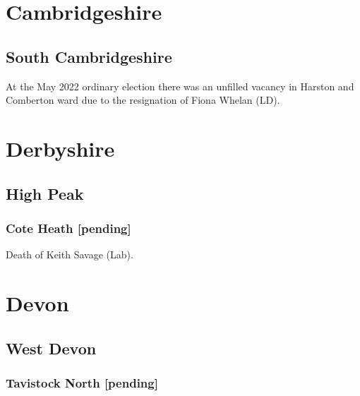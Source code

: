 \documentclass[a4paper,openany]{book}
\begin{document}
\begin{resultsiii}
\section{Cambridgeshire}

\subsection*{South Cambridgeshire}

At the May 2022 ordinary election there was an unfilled vacancy in Harston and Comberton ward due to the resignation of Fiona Whelan (LD).%

\section{Derbyshire}

\subsection*{High Peak}

\subsubsection*{Cote Heath \hspace*{\fill}\nolinebreak[1]%
	\enspace\hspace*{\fill}
	[pending]}


Death of Keith Savage (Lab).

\section{Devon}

\subsection*{West Devon}

\subsubsection*{Tavistock North \hspace*{\fill}\nolinebreak[1]%
	\enspace\hspace*{\fill}
	[pending]}


\end{resultsiii}
\end{document}
